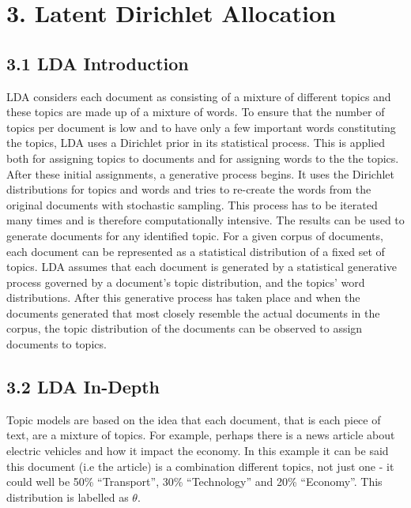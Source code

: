 \documentclass[
]{article}
\begin{document}
\hypertarget{latent-dirichlet-allocation}{%
\section{3. Latent Dirichlet
Allocation}\label{latent-dirichlet-allocation}}

\hypertarget{lda-introduction}{%
\subsection{3.1 LDA Introduction}\label{lda-introduction}}

LDA considers each document as consisting of a mixture of different
topics and these topics are made up of a mixture of words. To ensure
that the number of topics per document is low and to have only a few
important words constituting the topics, LDA uses a Dirichlet prior in
its statistical process. This is applied both for assigning topics to
documents and for assigning words to the the topics. After these initial
assignments, a generative process begins. It uses the Dirichlet
distributions for topics and words and tries to re-create the words from
the original documents with stochastic sampling. This process has to be
iterated many times and is therefore computationally intensive. The
results can be used to generate documents for any identified topic. For
a given corpus of documents, each document can be represented as a
statistical distribution of a fixed set of topics. LDA assumes that each
document is generated by a statistical generative process governed by a
document's topic distribution, and the topics' word distributions. After
this generative process has taken place and when the documents generated
that most closely resemble the actual documents in the corpus, the topic
distribution of the documents can be observed to assign documents to
topics.

\hypertarget{lda-in-depth}{%
\subsection{3.2 LDA In-Depth}\label{lda-in-depth}}

Topic models are based on the idea that each document, that is each
piece of text, are a mixture of topics. For example, perhaps there is a
news article about electric vehicles and how it impact the economy. In
this example it can be said this document (i.e the article) is a
combination different topics, not just one - it could well be 50\%
``Transport'', 30\% ``Technology'' and 20\% ``Economy''. This
distribution is labelled as \(\theta\).
\end{document}
